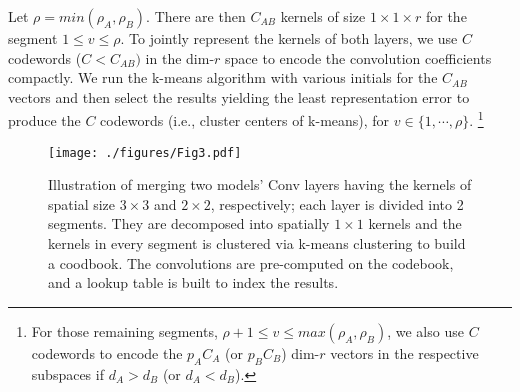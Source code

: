 \documentclass{article}
\begin{document}
	Let $\rho=min(\rho_A, \rho_B)$.
	There are then $C_{AB}$ kernels of size $1\times 1\times r$ for the segment $1\leq v \leq \rho$.
	To jointly represent the kernels of both layers, we use $C$ codewords ($C<C_{AB})$ in the dim-$r$ space to encode the convolution coefficients compactly.
	We run the k-means algorithm with various initials for the $C_{AB}$ vectors and then select the results yielding the least representation error to produce the $C$ codewords (i.e., cluster centers of k-means), for $v\in \{1,\cdots, \rho\}$.
	\footnote{For those remaining segments, $\rho+1\leq v \leq max(\rho_A,\rho_B)$, we also use $C$ codewords to encode the $p_AC_A$ (or $p_BC_B$) dim-$r$ vectors in the respective subspaces if $d_A>d_B$ (or $d_A<d_B$).}
	
	
	\begin{figure}[t]
		\begin{center}
			\texttt{[image: ./figures/Fig3.pdf]}
		\end{center}
		\vspace{-0.3cm}
		\caption{Illustration of merging two models' Conv layers having the kernels of spatial size $3\times3$ and $2\times 2$, respectively; each layer is divided into 2 segments. They are decomposed into spatially $1\times 1$ kernels and the kernels in every segment is clustered via k-means clustering to build a coodbook. The convolutions are pre-computed on the codebook, and a lookup table is built to index the results.}
		\label{fig:decomposition}
	\end{figure}
	
\end{document}
